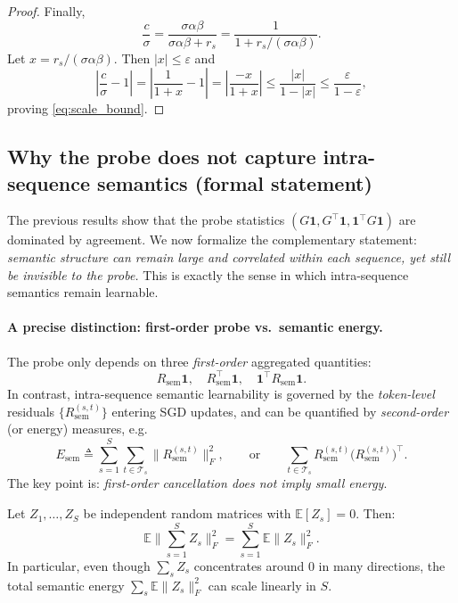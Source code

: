 \begin{proof}
Finally,
\[
\frac{c}{\sigma}
=
\frac{\sigma\alpha\beta}{\sigma\alpha\beta+r_s}
=
\frac{1}{1+r_s/(\sigma\alpha\beta)}.
\]
Let $x=r_s/(\sigma\alpha\beta)$. Then $|x|\le\varepsilon$ and
\[
\left|\frac{c}{\sigma}-1\right|
=
\left|\frac{1}{1+x}-1\right|
=
\left|\frac{-x}{1+x}\right|
\le
\frac{|x|}{1-|x|}
\le
\frac{\varepsilon}{1-\varepsilon},
\]
proving \eqref{eq:scale_bound}.
\end{proof}

\subsection{Why the probe does not capture intra-sequence semantics (formal statement)}
\label{sec:semantic_non_capture}

The previous results show that the probe statistics $(G\mathbf{1},G^\top\mathbf{1},\mathbf{1}^\top G\mathbf{1})$
are dominated by agreement. We now formalize the complementary statement: \emph{semantic structure can
remain large and correlated within each sequence, yet still be invisible to the probe.}
This is exactly the sense in which intra-sequence semantics remain learnable.

\paragraph{A precise distinction: first-order probe vs.\ semantic energy.}
The probe only depends on three \emph{first-order} aggregated quantities:
\[
R_{\mathrm{sem}}\mathbf{1},\quad R_{\mathrm{sem}}^\top\mathbf{1},\quad \mathbf{1}^\top R_{\mathrm{sem}}\mathbf{1}.
\]
In contrast, intra-sequence semantic learnability is governed by the \emph{token-level} residuals
$\{R_{\mathrm{sem}}^{(s,t)}\}$ entering SGD updates, and can be quantified by \emph{second-order}
(or energy) measures, e.g.
\[
E_{\mathrm{sem}}
\triangleq
\sum_{s=1}^S \sum_{t\in\mathcal{T}_s} \bigl\|R_{\mathrm{sem}}^{(s,t)}\bigr\|_F^2,
\qquad
\text{or}
\qquad
\sum_{t\in\mathcal{T}_s} R_{\mathrm{sem}}^{(s,t)} \bigl(R_{\mathrm{sem}}^{(s,t)}\bigr)^\top.
\]
The key point is: \emph{first-order cancellation does not imply small energy}.

\begin{lemma}
\label{lem:energy_vs_sum}
Let $Z_1,\dots,Z_S$ be independent random matrices with $\mathbb{E}[Z_s]=0$.
Then:
\begin{equation}
\label{eq:sum_small_energy_large}
\mathbb{E}\Big\|\sum_{s=1}^S Z_s\Big\|_F^2
=
\sum_{s=1}^S \mathbb{E}\|Z_s\|_F^2.
\end{equation}
In particular, even though $\sum_s Z_s$ concentrates around $0$ in many directions,
the total semantic energy $\sum_s \mathbb{E}\|Z_s\|_F^2$ can scale linearly in $S$.
\end{lemma}

